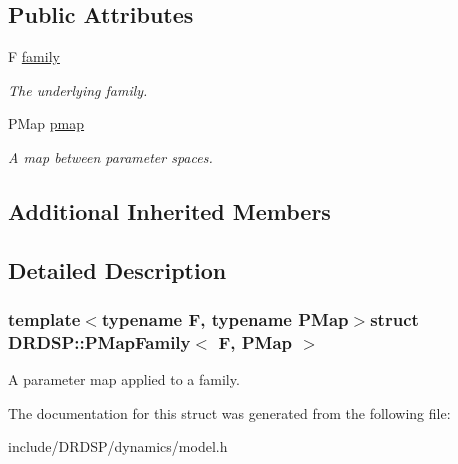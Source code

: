 \subsection*{Public Attributes}
\begin{DoxyCompactItemize}
\item 
\hypertarget{struct_d_r_d_s_p_1_1_p_map_family_adc9d74d88755b8efa9002560b6f75cb2}{F \hyperlink{struct_d_r_d_s_p_1_1_p_map_family_adc9d74d88755b8efa9002560b6f75cb2}{family}}\label{struct_d_r_d_s_p_1_1_p_map_family_adc9d74d88755b8efa9002560b6f75cb2}

\begin{DoxyCompactList}\small\item\em The underlying family. \end{DoxyCompactList}\item 
\hypertarget{struct_d_r_d_s_p_1_1_p_map_family_a8bd9bac383199f4c35460f5063a13f2b}{P\-Map \hyperlink{struct_d_r_d_s_p_1_1_p_map_family_a8bd9bac383199f4c35460f5063a13f2b}{pmap}}\label{struct_d_r_d_s_p_1_1_p_map_family_a8bd9bac383199f4c35460f5063a13f2b}

\begin{DoxyCompactList}\small\item\em A map between parameter spaces. \end{DoxyCompactList}\end{DoxyCompactItemize}
\subsection*{Additional Inherited Members}


\subsection{Detailed Description}
\subsubsection*{template$<$typename F, typename P\-Map$>$struct D\-R\-D\-S\-P\-::\-P\-Map\-Family$<$ F, P\-Map $>$}

A parameter map applied to a family. 

The documentation for this struct was generated from the following file\-:\begin{DoxyCompactItemize}
\item 
include/\-D\-R\-D\-S\-P/dynamics/model.\-h\end{DoxyCompactItemize}
